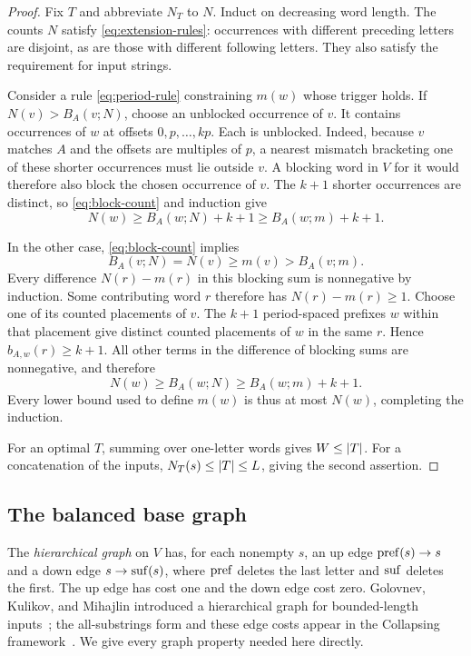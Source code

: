 \begin{proof}
Fix $T$ and abbreviate $N_T$ to $N$. Induct on decreasing word length. The counts $N$ satisfy \eqref{eq:extension-rules}: occurrences with different preceding letters are disjoint, as are those with different following letters. They also satisfy the requirement for input strings.

Consider a rule \eqref{eq:period-rule} constraining $m(w)$ whose trigger holds. If $N(v)>B_A(v;N)$, choose an unblocked occurrence of $v$. It contains occurrences of $w$ at offsets $0,p,\ldots,kp$. Each is unblocked. Indeed, because $v$ matches $A$ and the offsets are multiples of $p$, a nearest mismatch bracketing one of these shorter occurrences must lie outside $v$. A blocking word in $V$ for it would therefore also block the chosen occurrence of $v$. The $k+1$ shorter occurrences are distinct, so \eqref{eq:block-count} and induction give
\[
N(w)\ge B_A(w;N)+k+1\ge B_A(w;m)+k+1.
\]

In the other case, \eqref{eq:block-count} implies
\[
B_A(v;N)=N(v)\ge m(v)>B_A(v;m).
\]
Every difference $N(r)-m(r)$ in this blocking sum is nonnegative by induction. Some contributing word $r$ therefore has $N(r)-m(r)\ge1$. Choose one of its counted placements of $v$. The $k+1$ period-spaced prefixes $w$ within that placement give distinct counted placements of $w$ in the same $r$. Hence $b_{A,w}(r)\ge k+1$. All other terms in the difference of blocking sums are nonnegative, and therefore
\[
N(w)\ge B_A(w;N)\ge B_A(w;m)+k+1.
\]
Every lower bound used to define $m(w)$ is thus at most $N(w)$, completing the induction.

For an optimal $T$, summing over one-letter words gives $W\le\lvert T\rvert$. For a concatenation of the inputs, $N_T(s)\le\lvert T\rvert\le L$, giving the second assertion.
\end{proof}

\subsection{The balanced base graph}

The \emph{hierarchical graph} on $V$ has, for each nonempty $s$, an up edge $\operatorname{pref}(s)\to s$ and a down edge $s\to\operatorname{suf}(s)$, where $\operatorname{pref}$ deletes the last letter and $\operatorname{suf}$ deletes the first. The up edge has cost one and the down edge cost zero. Golovnev, Kulikov, and Mihajlin introduced a hierarchical graph for bounded-length inputs~\cite{golovnev2014}; the all-substrings form and these edge costs appear in the Collapsing framework~\cite[Section~2.2]{collapsing2020}. We give every graph property needed here directly.

